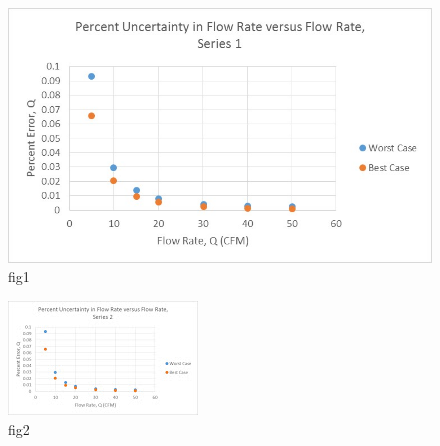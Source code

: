 \documentclass{article}
\begin{document}
  \begin{figure}[!htb]
   \begin{center}
    \includegraphics[width = 12 cm]{figs/PercentUncertaintyQVsQ_Series1.jpg}
    \caption{fig1}
    \label{orif-s1}
   \end{center}
  \end{figure}

  \begin{figure}[!htb]
   \begin{center}
    \includegraphics[width = 12 cm]{figs/PercentUncertaintyQVsQ_Series2.jpg}
    \caption{fig2}
    \label{orif-s2}
   \end{center}
  \end{figure}

%
%
%
\end{document}
